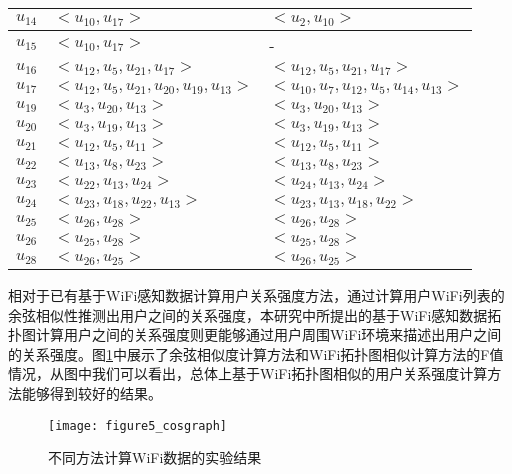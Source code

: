 \begin{table}[htbp]
\begin{tabular}{cll}
      \hline
      \mbox{$u_{14}$} &\mbox{$ <u_{10},u_{17} >$} &\mbox{$ <u_{2},u_{10} >$}\\
      \hline
      \mbox{$u_{15}$} & \mbox{$<u_{10},u_{17}>$} & -\\
      \hline
      \mbox{$u_{16}$} &\mbox{$ <u_{12},u_{5},u_{21},u_{17}>$} &\mbox{$ <u_{12},u_{5},u_{21},u_{17}>$} \\
      \hline
      \mbox{$u_{17} $}& \mbox{$< u_{12},u_{5},u_{21},u_{20},u_{19},u_{13}   >$} & \mbox{$< u_{10},u_{7},u_{12},u_{5},u_{14},u_{13}   >$}\\
      \hline
      \mbox{$u_{19} $}&\mbox{$ <u_{3},u_{20},u_{13}>$} &\mbox{$ <u_{3},u_{20},u_{13}>$}\\
      \hline
      \mbox{$u_{20}$} & \mbox{$<u_{3},u_{19},u_{13}>$} & \mbox{$<u_{3},u_{19},u_{13}>$}\\
      \hline
      \mbox{$u_{21}$} & \mbox{$ <u_{12},u_{5},u_{11}>$} & \mbox{$ <u_{12},u_{5},u_{11}>$}\\
      \hline
      \mbox{$u_{22} $}& \mbox{$ <u_{13},u_{8},u_{23}>$} & \mbox{$ <u_{13},u_{8},u_{23}>$}\\
      \hline
      \mbox{$u_{23}$} & \mbox{$ <u_{22},u_{13},u_{24}>$} & \mbox{$ <u_{24},u_{13},u_{24}>$}\\
      \hline
      \mbox{$u_{24}$} &\mbox{$ <u_{23},u_{18},u_{22},u_{13}>$} &\mbox{$ <u_{23},u_{13},u_{18},u_{22}>$}\\
      \hline
      \mbox{$u_{25} $}&\mbox{$ <u_{26},u_{28}>$} &\mbox{$ <u_{26},u_{28}>$}\\
      \hline
      \mbox{$u_{26} $}&\mbox{$ <u_{25},u_{28}>$} &\mbox{$ <u_{25},u_{28}>$}\\
      \hline
      \mbox{$u_{28}$} &\mbox{$ <u_{26},u_{25}>$} &\mbox{$ <u_{26},u_{25}>$}\\
      \bottomrule[1.5pt]
    \end{tabular}
\end{table}
\par 相对于已有基于WiFi感知数据计算用户关系强度方法，通过计算用户WiFi列表的余弦相似性推测出用户之间的关系强度，本研究中所提出的基于WiFi感知数据拓扑图计算用户之间的关系强度则更能够通过用户周围WiFi环境来描述出用户之间的关系强度。图\ref{fig:cosgraph}中展示了余弦相似度计算方法和WiFi拓扑图相似计算方法的F值情况，从图中我们可以看出，总体上基于WiFi拓扑图相似的用户关系强度计算方法能够得到较好的结果。
\begin{figure}[htb]
\centering
\texttt{[image: figure5\_cosgraph]}
\caption{不同方法计算WiFi数据的实验结果}
\label{fig:cosgraph}
\end{figure}


